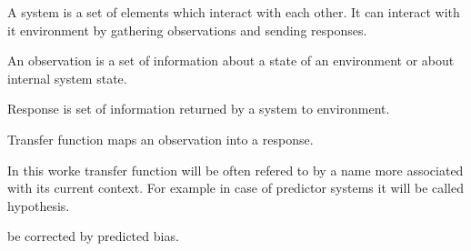 \begin{definition}[System]
	A system is a set of elements which interact with each other. It can interact with it 
	environment by gathering observations and sending responses.
\end{definition}

\begin{definition}[Observation]
	An observation is a set of information about a state of an environment or about internal
	system state.
\end{definition}

\begin{definition}[Response]
	Response is set of information returned by a system to environment.
\end{definition}

\begin{definition}
	Transfer function maps an observation into a response.
\end{definition}
In this worke transfer function will be often refered to by a name more associated with its 
current context. For example in case of predictor systems it will be called hypothesis.

be corrected by predicted bias.

